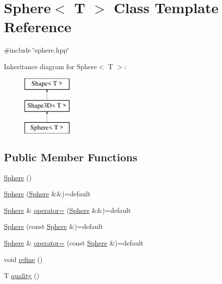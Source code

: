 \hypertarget{classSphere}{}\section{Sphere$<$ T $>$ Class Template Reference}
\label{classSphere}


{\ttfamily \#include \char`\"{}sphere.\+hpp\char`\"{}}

Inheritance diagram for Sphere$<$ T $>$\+:\begin{figure}[H]
\begin{center}
\leavevmode
\includegraphics[height=3.000000cm]{classSphere}
\end{center}
\end{figure}
\subsection*{Public Member Functions}
\begin{DoxyCompactItemize}
\item 
\mbox{\hyperlink{classSphere_acacfd6de079ea50acdaf57b823166651}{Sphere}} ()
\item 
\mbox{\hyperlink{classSphere_af0d667b078ae88955113205112d9aaa6}{Sphere}} (\mbox{\hyperlink{classSphere}{Sphere}} \&\&)=default
\item 
\mbox{\hyperlink{classSphere}{Sphere}} \& \mbox{\hyperlink{classSphere_aa117f966cea7b16532cbd80c2191a84a}{operator=}} (\mbox{\hyperlink{classSphere}{Sphere}} \&\&)=default
\item 
\mbox{\hyperlink{classSphere_ae28ad7649c59d653b9e14a3042d186a1}{Sphere}} (const \mbox{\hyperlink{classSphere}{Sphere}} \&)=default
\item 
\mbox{\hyperlink{classSphere}{Sphere}} \& \mbox{\hyperlink{classSphere_ae989d05c3ea71f5a758e90e2f2e3aecf}{operator=}} (const \mbox{\hyperlink{classSphere}{Sphere}} \&)=default
\item 
void \mbox{\hyperlink{classSphere_a3f5ee2b07e48a360696fe983690d1d1f}{refine}} ()
\item 
T \mbox{\hyperlink{classSphere_a9ebc65dabaf8d87fbe599f4b64816f73}{quality}} ()
\end{DoxyCompactItemize}
